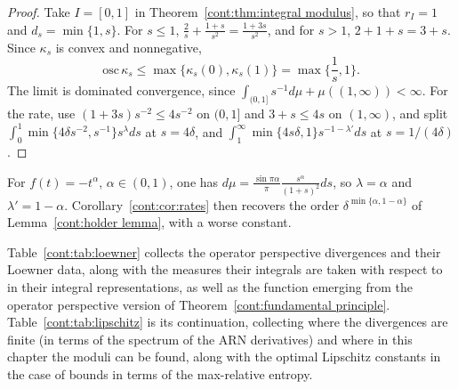 \begin{proof}
Take $I=[0,1]$ in Theorem~\ref{cont:thm:integral modulus}, so that $r_I=1$ and $d_s=\min\{1,s\}$. For $s\leq1$, $\frac2s+\frac{1+s}{s^2}=\frac{1+3s}{s^2}$, and for $s>1$, $2+1+s=3+s$. Since $\kappa_s$ is convex and nonnegative,
\[
\mathrm{osc}\,\kappa_s\leq\max\{\kappa_s(0),\kappa_s(1)\}=\max\{\frac1s,1\}.
\]
The limit is dominated convergence, since $\int_{(0,1]}s^{-1}d\mu+\mu((1,\infty))<\infty$. For the rate, use $(1+3s)s^{-2}\leq4s^{-2}$ on $(0,1]$ and $3+s\leq4s$ on $(1,\infty)$, and split $\int_0^1\min\{4\delta s^{-2},s^{-1}\}s^\lambda ds$ at $s=4\delta$, and $\int_1^\infty\min\{4s\delta,1\}s^{-1-\lambda'}ds$ at $s=1/(4\delta)$.
\end{proof}
 
For $f(t)=-t^\alpha$, $\alpha\in(0,1)$, one has $d\mu=\frac{\sin\pi\alpha}{\pi}\frac{s^{\alpha}}{(1+s)^2}ds$, so $\lambda=\alpha$ and $\lambda'=1-\alpha$. Corollary~\ref{cont:cor:rates} then recovers the order $\delta^{\min\{\alpha,1-\alpha\}}$ of Lemma~\ref{cont:holder lemma}, with a worse constant.

\begin{example}
    Table~\ref{cont:tab:loewner} collects the operator perspective divergences and their Loewner data, along with the measures their integrals are taken with respect to in their integral representations, as well as the function emerging from the operator perspective version of Theorem~\ref{cont:fundamental principle}. Table~\ref{cont:tab:lipschitz} is its continuation, collecting where the divergences are finite (in terms of the spectrum of the ARN derivatives) and where in this chapter the moduli can be found, along with the optimal Lipschitz constants in the case of bounds in terms of the max-relative entropy. 
\end{example}


